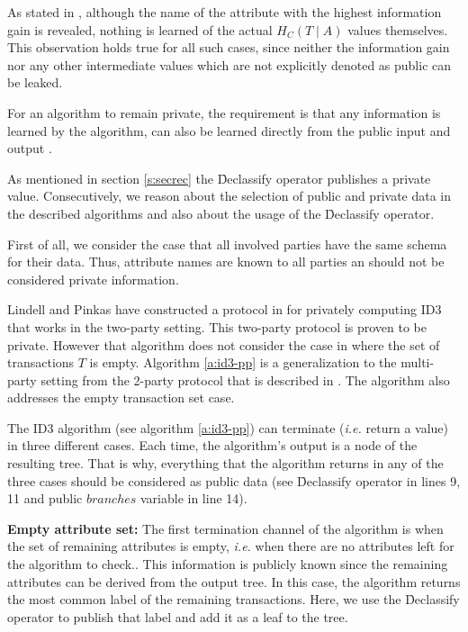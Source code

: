 As stated in \cite{lindell2000privacy}, although the name of the attribute with the highest information gain is revealed, nothing is learned of the actual $H_C(T \mid A)$ values themselves.
This observation holds true for all such cases, since neither the information gain nor any other intermediate values which are not explicitly denoted as public can be leaked.

For an algorithm to remain private, the requirement is that any information is learned by the algorithm, can also be learned directly from the public input and output \cite{lindell2000privacy}.

As mentioned in section \ref{s:secrec} the \f{Declassify} operator publishes a private value.
Consecutively, we reason about the selection of public and private data in the described algorithms and also about the usage of the \f{Declassify} operator.

First of all, we consider the case that all involved parties have the same schema for their data.
Thus, attribute names are known to all parties an should not be considered private information.

Lindell and Pinkas have constructed a protocol in \cite{lindell2000privacy} for privately computing ID3 that works in the two\hyp party setting.
This two\hyp party protocol is proven to be private.
However that algorithm does not consider the case in where the set of transactions $T$ is empty. Algorithm \ref{a:id3-pp} is a generalization to the multi\hyp party setting from the 2\hyp party protocol that is described in \cite{lindell2000privacy}.
The algorithm also addresses the empty transaction set case.

The ID3 algorithm (see algorithm \ref{a:id3-pp}) can terminate (\textit{i.e.} return a value) in three different cases.
Each time, the algorithm's output is a node of the resulting tree.
That is why, everything that the algorithm returns in any of the three cases should be considered as public data (see \f{Declassify} operator in lines 9, 11 and public $branches$ variable in line 14).

\textbf{Empty attribute set:}
The first termination channel of the algorithm is when the set of remaining attributes is empty, \textit{i.e.} when there are no attributes left for the algorithm to check..
This information is publicly known since the remaining attributes can be derived from the output tree.
In this case, the algorithm returns the most common label of the remaining transactions.
Here, we use the \f{Declassify} operator to publish that label and add it as a leaf to the tree.

